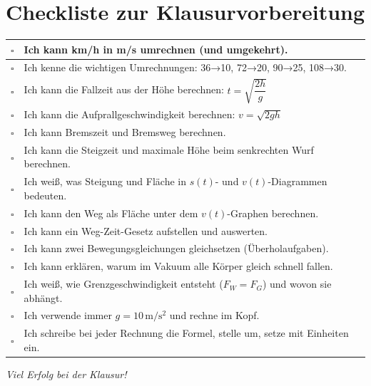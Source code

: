 \documentclass[11pt,a4paper]{article}
\begin{document}
\section{Checkliste zur Klausurvorbereitung}

\noindent{}

\vspace{0.3cm}

\begin{tabular}{|p{0.5cm}|p{14cm}|}
\hline
$\square$ & Ich kann km/h in m/s umrechnen (und umgekehrt). \\
\hline
$\square$ & Ich kenne die wichtigen Umrechnungen: 36→10, 72→20, 90→25, 108→30. \\
\hline
$\square$ & Ich kann die Fallzeit aus der Höhe berechnen: $t = \sqrt{\dfrac{2h}{g}}$ \\
\hline
$\square$ & Ich kann die Aufprallgeschwindigkeit berechnen: $v = \sqrt{2gh}$ \\
\hline
$\square$ & Ich kann Bremszeit und Bremsweg berechnen. \\
\hline
$\square$ & Ich kann die Steigzeit und maximale Höhe beim senkrechten Wurf berechnen. \\
\hline
$\square$ & Ich weiß, was Steigung und Fläche in $s(t)$- und $v(t)$-Diagrammen bedeuten. \\
\hline
$\square$ & Ich kann den Weg als Fläche unter dem $v(t)$-Graphen berechnen. \\
\hline
$\square$ & Ich kann ein Weg-Zeit-Gesetz aufstellen und auswerten. \\
\hline
$\square$ & Ich kann zwei Bewegungsgleichungen gleichsetzen (Überholaufgaben). \\
\hline
$\square$ & Ich kann erklären, warum im Vakuum alle Körper gleich schnell fallen. \\
\hline
$\square$ & Ich weiß, wie Grenzgeschwindigkeit entsteht ($F_W = F_G$) und wovon sie abhängt. \\
\hline
$\square$ & Ich verwende immer $g = 10\,\mathrm{m/s^2}$ und rechne im Kopf. \\
\hline
$\square$ & Ich schreibe bei jeder Rechnung die Formel, stelle um, setze mit Einheiten ein. \\
\hline
\end{tabular}

\vspace{1cm}

\noindent{}

\vspace{1cm}

\begin{center}
\textit{Viel Erfolg bei der Klausur!}
\end{center}
\end{document}
